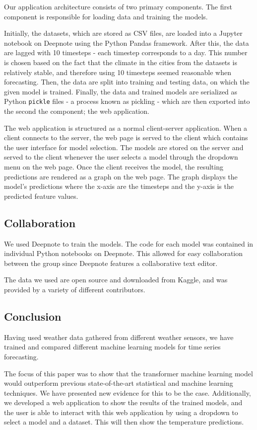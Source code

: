 Our application architecture consists of two primary components.
The first component is responsible for loading data and training the models.

Initially, the datasets, which are stored as CSV files, are loaded into a Jupyter notebook on Deepnote using the Python Pandas framework.
After this, the data are lagged with 10 timesteps - each timestep corresponds to a day.
This number is chosen based on the fact that the climate in the cities from the datasets is relatively stable, and therefore using 10 timesteps seemed reasonable when forecasting.
Then, the data are split into training and testing data, on which the given model is trained. 
Finally, the data and trained models are serialized as Python \texttt{pickle} files - a process known as pickling - which are then exported into the second the component; the web application.

The web application is structured as a normal client-server application.
When a client connects to the server, the web page is served to the client which contains the user interface for model selection.
The models are stored on the server and served to the client whenever the user selects a model through the dropdown menu on the web page.
Once the client receives the model, the resulting predictions are rendered as a graph on the web page.
The graph displays the model's predictions where the x-axis are the timesteps and the y-axis is the predicted feature values.

\subsection{Collaboration}
We used Deepnote\cite{deepnote} to train the models. 
The code for each model was contained in individual Python notebooks on Deepnote.
This allowed for easy collaboration between the group since Deepnote features a collaborative text editor.

The data we used are open source and downloaded from Kaggle\cite{kaggle}, and was provided by a variety of different contributors.


\subsection{Conclusion}
Having used weather data gathered from different weather sensors, we have trained and compared different machine learning models for time series forecasting.

The focus of this paper was to show that the transformer machine learning model would outperform previous state-of-the-art statistical and machine learning techniques. 
We have presented new evidence for this to be the case.
Additionally, we developed a web application to show the results of the trained models, and the user is able to interact with this web application by using a dropdown to select a model and a dataset. This will then show the temperature predictions.
